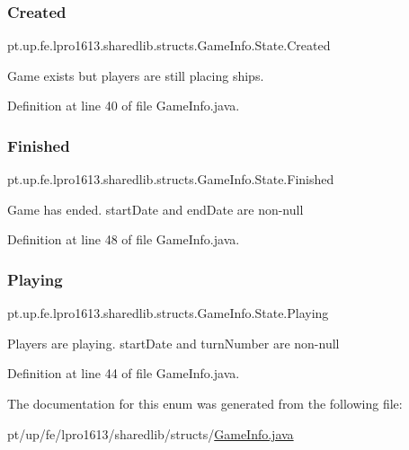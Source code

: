 \subsubsection{\texorpdfstring{Created}{Created}}
{\footnotesize\ttfamily pt.\+up.\+fe.\+lpro1613.\+sharedlib.\+structs.\+Game\+Info.\+State.\+Created}

Game exists but players are still placing ships. 

Definition at line 40 of file Game\+Info.\+java.

\hypertarget{enumpt_1_1up_1_1fe_1_1lpro1613_1_1sharedlib_1_1structs_1_1_game_info_1_1_state_ad04e28672f6f393a5b8705ef43d76af9}{}\label{enumpt_1_1up_1_1fe_1_1lpro1613_1_1sharedlib_1_1structs_1_1_game_info_1_1_state_ad04e28672f6f393a5b8705ef43d76af9} 
\subsubsection{\texorpdfstring{Finished}{Finished}}
{\footnotesize\ttfamily pt.\+up.\+fe.\+lpro1613.\+sharedlib.\+structs.\+Game\+Info.\+State.\+Finished}

Game has ended. start\+Date and end\+Date are non-\/null 

Definition at line 48 of file Game\+Info.\+java.

\hypertarget{enumpt_1_1up_1_1fe_1_1lpro1613_1_1sharedlib_1_1structs_1_1_game_info_1_1_state_a79e6ff19f3baa477e21195e12cadcebc}{}\label{enumpt_1_1up_1_1fe_1_1lpro1613_1_1sharedlib_1_1structs_1_1_game_info_1_1_state_a79e6ff19f3baa477e21195e12cadcebc} 
\subsubsection{\texorpdfstring{Playing}{Playing}}
{\footnotesize\ttfamily pt.\+up.\+fe.\+lpro1613.\+sharedlib.\+structs.\+Game\+Info.\+State.\+Playing}

Players are playing. start\+Date and turn\+Number are non-\/null 

Definition at line 44 of file Game\+Info.\+java.



The documentation for this enum was generated from the following file\+:\begin{DoxyCompactItemize}
\item 
pt/up/fe/lpro1613/sharedlib/structs/\hyperlink{_game_info_8java}{Game\+Info.\+java}\end{DoxyCompactItemize}
